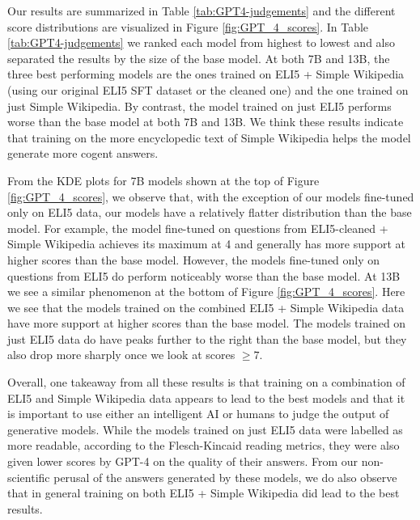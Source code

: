\documentclass[11pt, oneside]{article}   	%
\begin{document}
Our results are summarized in Table \ref{tab:GPT4-judgements} and the different score distributions are visualized in Figure \ref{fig:GPT_4_scores}.
In Table \ref{tab:GPT4-judgements} we ranked each model from highest to lowest and also separated the results by the size of the base model.
At both 7B and 13B, the three best performing models are the ones trained on ELI5 + Simple Wikipedia (using our original ELI5 SFT dataset or the cleaned one) and the one trained on just Simple Wikipedia.
By contrast, the model trained on just ELI5 performs worse than the base model at both 7B and 13B.
We think these results indicate that training on the more encyclopedic text of Simple Wikipedia helps the model generate more cogent answers.

From the KDE plots for 7B models shown at the top of Figure \ref{fig:GPT_4_scores}, we observe that, with the exception of our models fine-tuned only on ELI5 data, our models have a relatively flatter distribution than the base model.
For example, the model fine-tuned on questions from ELI5-cleaned + Simple Wikipedia achieves its maximum at 4 and generally has more support at higher scores than the base model. 
However, the models fine-tuned only on questions from ELI5 do perform noticeably worse than the base model.
At 13B we see a similar phenomenon at the bottom of Figure \ref{fig:GPT_4_scores}.
Here we see that the models trained on the combined ELI5 + Simple Wikipedia data have more support at higher scores than the base model. 
The models trained on just ELI5 data do have peaks further to the right than the base model, but they also drop more sharply once we look at scores $\geq 7$.

Overall, one takeaway from all these results is that training on a combination of ELI5 and Simple Wikipedia data appears to lead to the best models and that it is important to use either an intelligent AI or humans to judge the output of generative models.
While the models trained on just ELI5 data were labelled as more readable, according to the Flesch-Kincaid reading metrics, they were also given lower scores by GPT-4 on the quality of their answers.
From our non-scientific perusal of the answers generated by these models, we do also observe that in general training on both ELI5 + Simple Wikipedia did lead to the best results.
\end{document}

